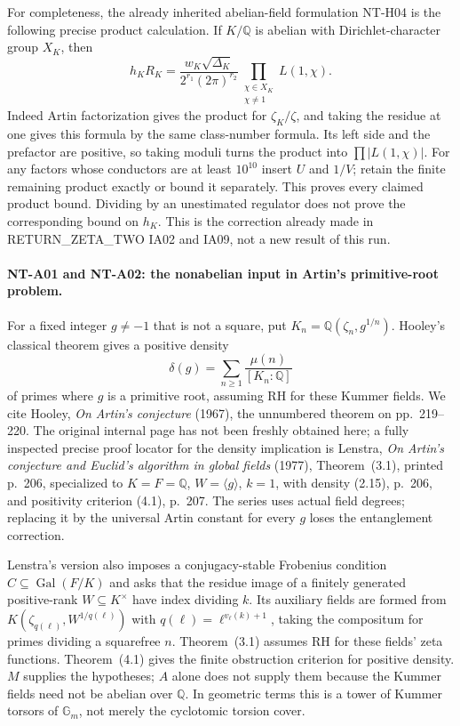 For completeness, the already inherited abelian-field formulation
NT-H04 is the following precise product calculation.  If $K/\mathbb Q$
is abelian with Dirichlet-character group $X_K$, then
\[
 h_KR_K=\frac{w_K\sqrt{\Delta_K}}{2^{r_1}(2\pi)^{r_2}}
              \prod_{\substack{\chi\in X_K\\\chi\ne1}}L(1,\chi).
\tag{NT-H04}
\]
Indeed Artin factorization gives the product for $\zeta_K/\zeta$,
and taking the residue at one gives this formula by the same class-number
formula.  Its left side and the prefactor are positive, so taking moduli
turns the product into $\prod|L(1,\chi)|$.  For any factors whose
conductors are at least $10^{10}$ insert $U$ and $1/V$; retain the finite
remaining product exactly or bound it separately.  This proves every
claimed product bound.  Dividing by an unestimated regulator does not
prove the corresponding bound on $h_K$.  This is the correction already
made in RETURN\_ZETA\_TWO IA02 and IA09, not a new result of this run.

\paragraph{NT-A01 and NT-A02: the nonabelian input in Artin's primitive-root problem.}
For a fixed integer $g\ne-1$ that is not a square, put
$K_n=\mathbb Q(\zeta_n,g^{1/n})$.  Hooley's classical theorem gives a
positive density
\[
 \delta(g)=\sum_{n\ge1}\frac{\mu(n)}{[K_n:\mathbb Q]}
\]
of primes where $g$ is a primitive root, assuming RH for these Kummer
fields.  We cite Hooley, \emph{On Artin's conjecture} (1967), the
unnumbered theorem on pp.~219--220.  The original internal page has not
been freshly obtained here; a fully inspected precise proof locator for
the density implication is Lenstra, \emph{On Artin's conjecture and
Euclid's algorithm in global fields} (1977), Theorem~(3.1), printed
p.~206, specialized to $K=F=\mathbb Q$, $W=\langle g\rangle$, $k=1$,
with density (2.15), p.~206, and positivity criterion (4.1), p.~207.
The series uses actual field degrees; replacing it by the universal
Artin constant for every $g$ loses the entanglement correction.

Lenstra's version also imposes a conjugacy-stable Frobenius condition
$C\subseteq\operatorname{Gal}(F/K)$ and asks that the residue image of
a finitely generated positive-rank $W\subseteq K^\times$ have index
dividing $k$.  Its auxiliary fields are formed from
$K(\zeta_{q(\ell)},W^{1/q(\ell)})$ with
$q(\ell)=\ell^{v_\ell(k)+1}$, taking the compositum for primes dividing
a squarefree $n$.  Theorem~(3.1) assumes RH for these fields' zeta
functions.  Theorem~(4.1) gives the finite obstruction criterion for
positive density.  $M$ supplies the hypotheses; $A$ alone does not
supply them because the Kummer fields need not be abelian over
$\mathbb Q$.  In geometric terms this is a tower of Kummer torsors of
$\mathbb G_m$, not merely the cyclotomic torsion cover.

